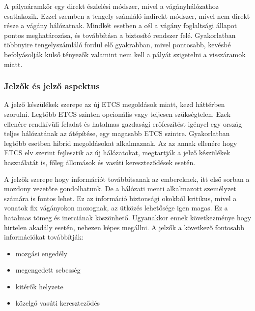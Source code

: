 \documentclass[a4paper,12pt]{article}
\begin{document}
A pályaáramkör egy direkt észlelési módszer, mivel a vágányhálózathoz csatlakozik.
Ezzel szemben a tengely számláló indirekt módszer, mivel nem direkt része a vágány hálózatnak. 
Mindkét esetben a cél a vágány foglaltsági állapot pontos meghatározása, és továbbítása a biztosító rendszer felé.
Gyakorlatban többnyire tengelyszámláló fordul elő gyakrabban, mivel pontosabb, kevésbé befolyásolják külső tényezők valamint nem kell a pályát szigetelni a visszáramok miatt.

\subsubsection{Jelzők és jelző aspektus}

A jelző készülékek szerepe az új ETCS megoldások miatt, kezd háttérben szorulni.
Legtöbb ETCS szinten opcionális vagy teljesen szükségtelen. 
Ezek ellenére rendkívüli feladat és hatalmas gazdasági erőfeszítést igényel egy ország teljes hálózatának az átépítése, egy magasabb ETCS szintre.
Gyakorlatban legtöbb esetben hibrid megoldásokat alkalmaznak.
Az az annak ellenére hogy ETCS elv szerint fejlesztik az új hálózatokat, megtartják a jelző készülékek használatát is, főleg állomások és vasúti kereszteződések esetén.

A jelzők szerepe hogy információt továbbítsanak az embereknek, itt első sorban a mozdony vezetőre gondolhatunk. 
De a hálózati menti alkalmazott személyzet számára is fontos lehet.
Ez az információ biztonsági okokból kritikus, mivel a vonatok fix vágányokon mozognak, az ütközés lehetősége igen magas.
Ez a hatalmas tömeg és inerciának köszönhető. Ugyanakkor ennek következménye hogy hirtelen akadály esetén, nehezen képes megállni.
A jelzők a következő fontosabb információkat továbbítják:
\begin{itemize}
	\item mozgási engedély
	\item megengedett sebesség
	\item kitérők helyzete
	\item közelgő vasúti kereszteződés
\end{itemize}
\end{document}
